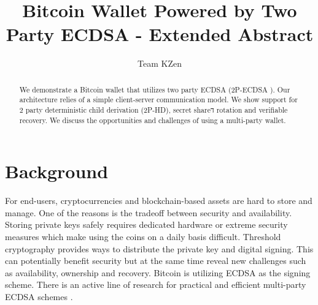 \documentclass[runningheads]{llncs}
\begin{document}
%
\title{Bitcoin Wallet Powered by Two Party ECDSA - Extended Abstract}
%
%
\author{Team KZen}
%
%
%
\maketitle              %
%
\begin{abstract}
We demonstrate a Bitcoin wallet that utilizes two party ECDSA (2P-ECDSA \cite{lindell17}). Our architecture relies of a simple client-server communication model. We show support for 2 party deterministic child derivation (2P-HD), secret shareד rotation and verifiable recovery. We discuss the opportunities and challenges of using a multi-party wallet. 
 
 
\end{abstract}
%
%
%
\section{Background}
For end-users, cryptocurrencies and blockchain-based assets are hard to store and manage. One of the reasons is the tradeoff between security and availability. Storing private keys safely requires dedicated hardware or extreme security measures which make using the coins on a daily basis difficult. Threshold cryptography provides ways to distribute the private key and digital signing. This can potentially benefit security but at the same time reveal new challenges such as availability, ownership and recovery.
Bitcoin is utilizing ECDSA as the signing scheme. There is an active line of research for practical and efficient multi-party ECDSA schemes \cite{mackenzie,boneh17,lindell17,doerner,goldfeder18,lindell18}.
\end{document}
